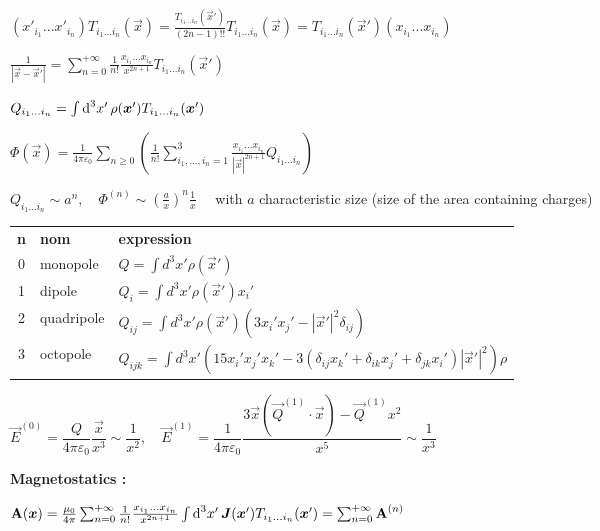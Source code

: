 \item $(x'_{i_1}...x'_{i_n}) T_{i_1 ... i_n}(\vec{x}) = \frac{T_{i_1 ... i_n}(\vec{x}')}{(2n-1)!!} T_{i_1 ... i_n}(\vec{x}) = T_{i_1...i_n}(\vec{x}') (x_{i_1}...x_{i_n})$

\item $\frac{1}{|\vec{x} - \vec{x}'|} = \sum_{n=0}^{+\infty} \frac{1}{n!} \frac{x_{i_1}...x_{i_n}}{x^{2n+1}} T_{i_1...i_n}(\vec{x}')$

\item $Q_{i_1...i_n} = \int \textrm{d} ^3x' \, \rho(\mbox{\boldmath$x$}') T_{i_1...i_n}(\mbox{\boldmath$x$}')$

\item $ \Phi(\vec{x}) = \frac{1}{4\pi\varepsilon_0}\sum_{n\geq0}\left(\frac{1}{n!}\sum_{i_1,...,i_n = 1}^{3}\frac{x_{i_1}...x_{i_n}}{|\vec{x}|^{2n+1}}Q_{i_1...i_n}\right)$

\item $Q_{i_1...i_n} \sim a^n , \quad \Phi^{(n)} \sim \left(\frac{a}{x}\right)^n \frac{1}{x} \quad$ with $a$ characteristic size (size of the area containing charges)

\item \begin{tabular}{c | l l}
	\textbf{n} & \textbf{nom} & \textbf{expression} \\
	0 & monopole & $Q = \int d^3x' \rho (\vec{x}')$ \\
	1 & dipole & $Q_i = \int d^3x' \rho (\vec{x}') x_i'$ \\
	2 & quadripole & $Q_{ij} = \int d^3x' \rho (\vec{x}') (3x_i'x_j' - |\vec{x}'|^2\delta_{ij})$ \\
	3 & octopole & $Q_{ijk} = \int d^3x' (15x_i'x_j'x_k' -3(\delta_{ij}x_k' + \delta_{ik}x_j'+\delta_{jk}x_i') |\vec{x}'|^2)\rho$
\end{tabular}

\item $\vec{E}^{(0)} = \dfrac{Q}{4\pi\varepsilon_0} \dfrac{\vec{x}}{x^3} \sim \dfrac{1}{x^2} ,\quad \vec{E}^{(1)} = \dfrac{1}{4\pi\varepsilon_0}\dfrac{3\vec{x}(\vec{Q}^{(1)}\cdot\vec{x}) - \vec{Q}^{(1)}x^2}{x^5} \sim \dfrac{1}{x^3}$

\item \textbf{Magnetostatics :}

\item $\mbox{\boldmath$\rm{A}$}(\mbox{\boldmath$x$}) = \frac{\mu_0}{4\pi} \sum_{n=0}^{+\infty} \frac{1}{n!} \frac{x_{i_1}...x_{i_n}}{x^{2n+1}} \int \textrm{d} ^3x' \, \mbox{\boldmath$J$}(\mbox{\boldmath$x$}') T_{i_1...i_n}(\mbox{\boldmath$x$}') = \sum_{n=0}^{+\infty} \mbox{\boldmath$\rm{A}$}^{(n)}$

